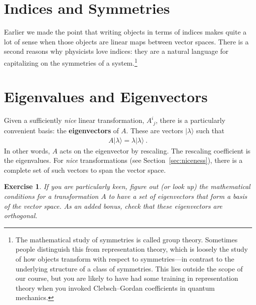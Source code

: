 \documentclass[
  11pt,
	colorful,
	raggedright,
]{tufte-style-thesis-flip}
\newtheorem{exercise}{Exercise}[section]
\newcommand{\aij}[2]{^{#1}_{\phantom{#1}#2}}
\begin{document}
\section{Indices and Symmetries}
\label{sec:indices:symmetries}

Earlier we made the point that writing objects in terms of indices makes quite a lot of sense when those objects are linear maps between vector spaces. There is a second reasons why physicists love indices: they are a natural language for capitalizing on the symmetries of a system.\footnote{The mathematical study of symmetries is called group theory. Sometimes people distinguish this from representation theory, which is loosely the study of how objects transform with respect to symmetries---in contrast to the underlying structure of a class of symmetries. This lies outside the scope of our course, but you are likely to have had some training in representation theory when you invoked Clebsch--Gordan coefficients in quantum mechanics.}


\section{Eigenvalues and Eigenvectors}

\label{sec:eigenvectors}

Given a sufficiently \emph{nice} linear transformation, $A\aij{i}{j}$, there is a particularly convenient basis: the \textbf{eigenvectors} of $A$. These are vectors $|\lambda\rangle$ such that
\begin{align}
  A |\lambda\rangle = \lambda |\lambda\rangle \ .
\end{align}
In other words, $A$ acts on the eigenvector by rescaling. The rescaling coefficient is the eigenvalues. For \emph{nice} transformations (see Section~\ref{sec:niceness}), there is a complete set of such vectors to span the vector space. 
\begin{exercise}
If you are particularly keen, figure out (or look up) the mathematical conditions for a transformation $A$ to have a set of eigenvectors that form a basis of the vector space. As an added bonus, check that these eigenvectors are orthogonal.
\end{exercise}
\end{document}
